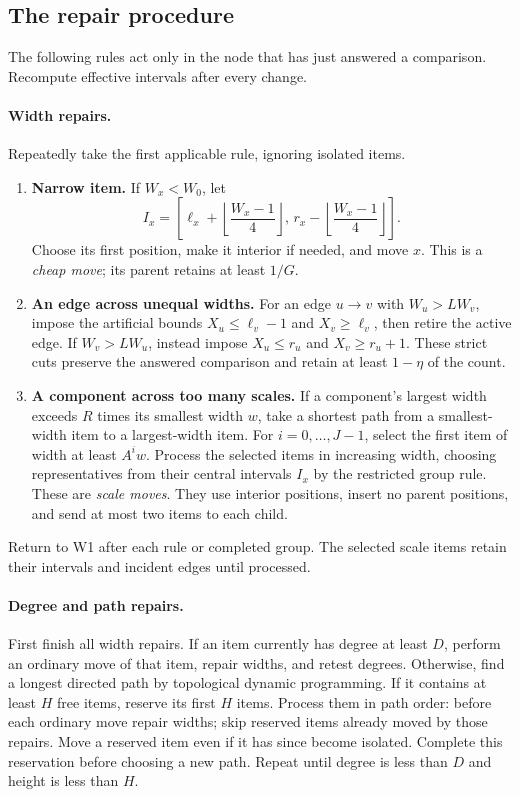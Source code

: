\subsection{The repair procedure}
\label{sec:repairs}

The following rules act only in the node that has just answered a comparison.
Recompute effective intervals after every change.

\paragraph{Width repairs.}
Repeatedly take the first applicable rule, ignoring isolated items.
\begin{enumerate}[label=\textbf{W\arabic*.},leftmargin=11mm]
\item \textbf{Narrow item.}
If $W_x<W_0$, let
\[
 I_x=\left[\ell_x+\left\lfloor\frac{W_x-1}{4}\right\rfloor,\,
 r_x-\left\lfloor\frac{W_x-1}{4}\right\rfloor\right].
\]
Choose its first position, make it interior if needed, and move $x$.
This is a \emph{cheap move}; its parent retains at least $1/G$.

\item \textbf{An edge across unequal widths.}
For an edge $u\to v$ with $W_u>LW_v$, impose the artificial bounds
$X_u\leq\ell_v-1$ and $X_v\geq\ell_v$, then retire the active edge.
If $W_v>LW_u$, instead impose $X_u\leq r_u$ and $X_v\geq r_u+1$.
These strict cuts preserve the answered comparison and retain at least
$1-\eta$ of the count.

\item \textbf{A component across too many scales.}
If a component's largest width exceeds $R$ times its smallest width $w$,
take a shortest path from a smallest-width item to a largest-width item.
For $i=0,\ldots,J-1$, select the first item of width at least $A^i w$.
Process the selected items in increasing width, choosing representatives
from their central intervals $I_x$ by the restricted group rule.
These are \emph{scale moves}. They use interior positions, insert no
parent positions, and send at most two items to each child.
\end{enumerate}
Return to W1 after each rule or completed group. The selected scale items
retain their intervals and incident edges until processed.

\paragraph{Degree and path repairs.}
First finish all width repairs.
If an item currently has degree at least $D$, perform an ordinary move of
that item, repair widths, and retest degrees. Otherwise, find a longest
directed path by topological dynamic programming. If it contains at least
$H$ free items, reserve its first $H$ items. Process them in path
order: before each ordinary move repair widths; skip reserved items already
moved by those repairs. Move a reserved item even if it has since become
isolated. Complete this reservation before choosing a new path.
Repeat until degree is less than $D$ and height is less than $H$.

